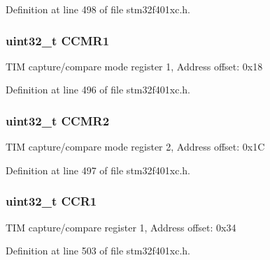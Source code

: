 Definition at line 498 of file stm32f401xc.\+h.

\subsubsection[{\texorpdfstring{C\+C\+M\+R1}{CCMR1}}]{ uint32\+\_\+t C\+C\+M\+R1}\hypertarget{struct_t_i_m___type_def_adb72f64492a75e780dd2294075c70fed}{}\label{struct_t_i_m___type_def_adb72f64492a75e780dd2294075c70fed}
T\+IM capture/compare mode register 1, Address offset\+: 0x18 

Definition at line 496 of file stm32f401xc.\+h.

\subsubsection[{\texorpdfstring{C\+C\+M\+R2}{CCMR2}}]{ uint32\+\_\+t C\+C\+M\+R2}\hypertarget{struct_t_i_m___type_def_a091452256c9a16c33d891f4d32b395bf}{}\label{struct_t_i_m___type_def_a091452256c9a16c33d891f4d32b395bf}
T\+IM capture/compare mode register 2, Address offset\+: 0x1C 

Definition at line 497 of file stm32f401xc.\+h.

\subsubsection[{\texorpdfstring{C\+C\+R1}{CCR1}}]{ uint32\+\_\+t C\+C\+R1}\hypertarget{struct_t_i_m___type_def_adab1e24ef769bbcb3e3769feae192ffb}{}\label{struct_t_i_m___type_def_adab1e24ef769bbcb3e3769feae192ffb}
T\+IM capture/compare register 1, Address offset\+: 0x34 

Definition at line 503 of file stm32f401xc.\+h.

